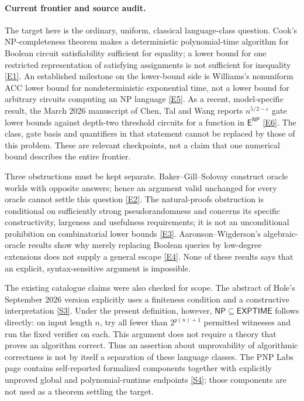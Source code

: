 \documentclass[11pt]{article}
\newcommand{\sref}[2]{\hyperlink{source:#1:#2}{[S#2]}}
\newcommand{\eref}[2]{\hyperlink{extra:#1:#2}{[E#2]}}
\begin{document}
\paragraph{Current frontier and source audit.}
The target here is the ordinary, uniform, classical language-class question.
Cook's NP-completeness theorem makes a deterministic polynomial-time algorithm
for Boolean circuit satisfiability sufficient for equality; a lower bound for
one restricted representation of satisfying assignments is not sufficient for
inequality \eref{1}{1}. An established milestone on the lower-bound side is
Williams's nonuniform ACC lower bound for nondeterministic exponential time,
not a lower bound for arbitrary circuits computing an NP language
\eref{1}{5}. As a recent, model-specific result, the March 2026 manuscript of
Chen, Tal and Wang reports $n^{5/2-\varepsilon}$ gate lower bounds against
depth-two threshold circuits for a function in $\mathsf E^{\mathsf{NP}}$
\eref{1}{6}. The class, gate basis and quantifiers in that statement cannot be
replaced by those of this problem. These are relevant checkpoints, not a claim
that one numerical bound describes the entire frontier.

Three obstructions must be kept separate. Baker--Gill--Solovay construct oracle
worlds with opposite answers; hence an argument valid unchanged for every
oracle cannot settle this question \eref{1}{2}. The natural-proofs obstruction
is conditional on sufficiently strong pseudorandomness and concerns its
specific constructivity, largeness and usefulness requirements; it is not an
unconditional prohibition on combinatorial lower bounds \eref{1}{3}.
Aaronson--Wigderson's algebraic-oracle results show why merely replacing Boolean
queries by low-degree extensions does not supply a general escape
\eref{1}{4}. None of these results says that an explicit, syntax-sensitive
argument is impossible.

The existing catalogue claims were also checked for scope. The abstract of
Hole's September 2026 version explicitly uses a finiteness condition and a
constructive interpretation \sref{1}{3}. Under the present definition, however,
$\mathsf{NP}\subseteq\mathsf{EXPTIME}$ follows directly: on input length $n$,
try all fewer than $2^{p(n)+1}$ permitted witnesses and run the fixed verifier
on each. This argument does not require a theory that proves an algorithm
correct. Thus an assertion about unprovability of algorithmic correctness is
not by itself a separation of these language classes. The PNP Labs page
contains self-reported formalized components together with explicitly
unproved global and polynomial-runtime endpoints \sref{1}{4}; those components
are not used as a theorem settling the target.
\end{document}
